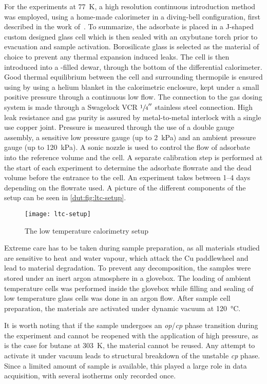 For the experiments at \SI{77}{\kelvin}, a high resolution continuous
introduction method was employed, using a home-made calorimeter
in a diving-bell configuration, first described in the work 
of~\citet{rouquerolCalorimetricEvidenceBidimensional1977}. To summarize,
the adsorbate is placed in a J-shaped custom designed glass cell which is
then sealed with an oxybutane torch prior to evacuation and sample 
activation. Borosilicate glass is selected as
the material of choice to prevent any thermal expansion induced leaks.
The cell is then introduced into a -filled dewar, through 
the bottom of the differential calorimeter. Good thermal equilibrium
between the cell and surrounding thermopile is ensured using by 
using a helium blanket in the calorimetric enclosure, kept under a small
positive pressure through a continuous low flow. The connection to the 
gas dosing system is made through a Swagelock VCR \(\sfrac{1}{4}''\)
stainless steel connection. High leak resistance and gas purity 
is assured by metal-to-metal interlock with a single use copper joint.
Pressure is measured through the use of a double gauge assembly,
a sensitive low pressure gauge (up to \SI{2}{\kilo\pascal}) and 
an ambient pressure gauge (up to \SI{120}{\kilo\pascal}).
A sonic nozzle is used to control the flow of adsorbate into the 
reference volume and the cell. A separate calibration step is 
performed at the start of each experiment to determine the adsorbate
flowrate and the dead volume before the entrance to the cell.
An experiment takes between 1--4 days depending 
on the flowrate used. A picture of the different components of the 
setup can be seen in \autoref{dut:fig:ltc-setup}.

\begin{figure}[htb]
    \centering
    \texttt{[image: ltc-setup]}%
    \caption{The low temperature calorimetry setup}%
    \label{dut:fig:ltc-setup}
\end{figure}

Extreme care has to be taken during sample preparation, as all materials 
studied are sensitive to heat and water vapour, which attack
the Cu paddlewheel and lead to material degradation. To prevent any 
decomposition, the samples were stored under an inert argon 
atmosphere in a glovebox. The loading of ambient temperature 
cells was performed inside the glovebox while filling and sealing 
of low temperature glass cells was done in an argon flow. After 
sample cell preparation, the materials are activated under 
dynamic vacuum at \SI{120}{\degreeCelsius}. 

It is worth noting that if the sample undergoes an \textit{op}/\textit{cp}
phase transition during the experiment and cannot be reopened with
the application of high pressure, as is the case for butane at 
\SI{303}{\kelvin}, the material cannot be reused. Any attempt to
activate it under vacuum leads to structural breakdown of the 
unstable \textit{cp} phase. 
Since a limited amount of sample is available, this played a large
role in data acquisition, with several isotherms only recorded once.
